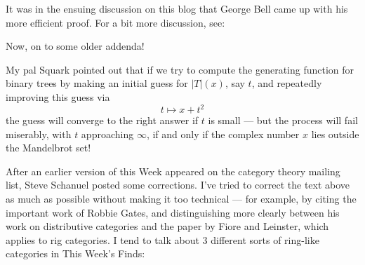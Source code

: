 \documentclass{article}
\def\tightlist{}
\renewcommand{\texttt}[1]{%
  \begingroup
  \ttfamily
  \begingroup\lccode`~=`/\lowercase{\endgroup\def~}{/\discretionary{}{}{}}%
  \begingroup\lccode`~=`[\lowercase{\endgroup\def~}{[\discretionary{}{}{}}%
  \begingroup\lccode`~=`.\lowercase{\endgroup\def~}{.\discretionary{}{}{}}%
  \catcode`/=\active\catcode`[=\active\catcode`.=\active
  \scantokens{#1\noexpand}%
  \endgroup
}
\begin{document}
It was in the ensuing discussion on this blog that George Bell came up
with his more efficient proof. For a bit more discussion, see:


Now, on to some older addenda!

My pal Squark pointed out that if we try to compute the generating
function for binary trees by making an initial guess for \(|T|(x)\), say
\(t\), and repeatedly improving this guess via \[t \mapsto x + t^2\] the
guess will converge to the right answer if \(t\) is small --- but the
process will fail miserably, with \(t\) approaching \(\infty\), if and
only if the complex number \(x\) lies outside the Mandelbrot set!

After an earlier version of this Week appeared on the category theory
mailing list, Steve Schanuel posted some corrections. I've tried to
correct the text above as much as possible without making it too
technical --- for example, by citing the important work of Robbie Gates,
and distinguishing more clearly between his work on distributive
categories and the paper by Fiore and Leinster, which applies to rig
categories. I tend to talk about 3 different sorts of ring-like
categories in This Week's Finds:
\end{document}
